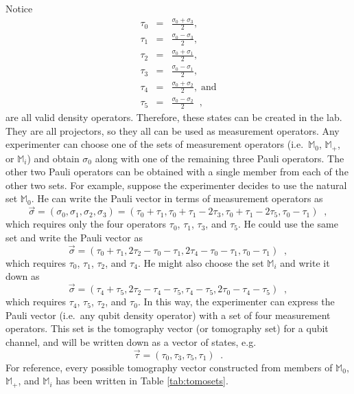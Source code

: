 Notice
\begin{eqnarray*}
\tau_0 &=& \frac{\sigma_0+\sigma_3}{2},\\
\tau_1 &=& \frac{\sigma_0-\sigma_3}{2},\\
\tau_2 &=& \frac{\sigma_0+\sigma_1}{2},\\
\tau_3 &=& \frac{\sigma_0-\sigma_1}{2},\\
\tau_4 &=& \frac{\sigma_0+\sigma_2}{2},\;\mathrm{and}\\
\tau_5 &=& \frac{\sigma_0-\sigma_2}{2}\;\;,
\end{eqnarray*}
are all valid density operators.  Therefore, these states can be created in the lab.  They are all projectors, so they all can be used as measurement operators.  Any experimenter can choose one of the sets of measurement operators (i.e.\ $\mathbb{M}_0$, $\mathbb{M}_+$, or $\mathbb{M}_i$) and obtain $\sigma_0$ along with one of the remaining three Pauli operators.  The other two Pauli operators can be obtained with a single member from each of the other two sets.  For example, suppose the experimenter decides to use the natural set $\mathbb{M}_0$.  He can write the Pauli vector in terms of measurement operators as
$$
\vec{\sigma} = (\sigma_0,\sigma_1,\sigma_2,\sigma_3) = (\tau_0+\tau_1,\tau_0+\tau_1-2\tau_3,\tau_0+\tau_1-2\tau_5,\tau_0-\tau_1)\;\;,
$$
which requires only the four operators $\tau_0$, $\tau_1$, $\tau_3$, and $\tau_5$.  He could use the same set and write the Pauli vector as
$$
\vec{\sigma} = (\tau_0+\tau_1,2\tau_2-\tau_0-\tau_1,2\tau_4-\tau_0-\tau_1,\tau_0-\tau_1)\;\;,
$$
which requires $\tau_0$, $\tau_1$, $\tau_2$, and $\tau_4$.  He might also choose the set $\mathbb{M}_i$ and write it down as
$$
\vec{\sigma} = (\tau_4+\tau_5,2\tau_2-\tau_4-\tau_5,\tau_4-\tau_5,2\tau_0-\tau_4-\tau_5)\;\;,
$$
which requires $\tau_4$, $\tau_5$, $\tau_2$, and $\tau_0$.  In this way, the experimenter can express the Pauli vector (i.e.\ any qubit density operator) with a set of four measurement operators.  This set is the tomography vector (or tomography set) for a qubit channel, and will be written down as a vector of states, e.g.\
$$
\vec{\tau} = (\tau_0,\tau_3,\tau_5,\tau_1)\;\;.
$$
For reference, every possible tomography vector constructed from members of $\mathbb{M}_{0}$, $\mathbb{M}_{+}$, and $\mathbb{M}_{i}$ has been written in Table \ref{tab:tomosets}.

